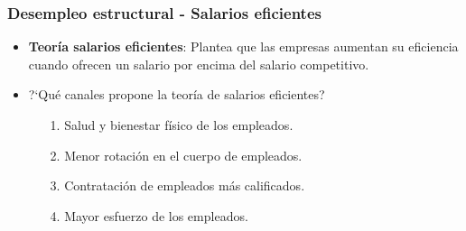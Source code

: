 \documentclass{beamer}
\begin{document}
\begin{frame}
\frametitle{Desempleo estructural - Salarios eficientes}
\begin{itemize}
\setlength\itemsep{1.4em}
\item \textbf{Teor\'ia salarios eficientes}: Plantea que las empresas aumentan su eficiencia cuando ofrecen un salario por encima del salario competitivo.
\item ?`Qu\'e canales propone la teor\'ia de salarios eficientes?\\
\vspace{2mm}
\begin{itemize}
\setlength\itemsep{0.8em}
\item[1.] Salud y bienestar f\'isico de los empleados.
\item[2.] Menor rotaci\'on en el cuerpo de empleados. 
\item[3.] Contrataci\'on de empleados m\'as calificados.
\item[4.] Mayor esfuerzo de los empleados.
\end{itemize}
\end{itemize}
\end{frame}
\end{document}
